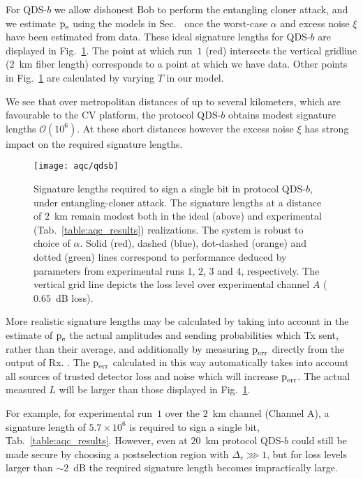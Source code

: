 For QDS-$b$ we allow dishonest Bob to perform the entangling cloner attack, and we estimate $\text{p}_{\text{e}}$ using the models in Sec.~ once the worst-case $\alpha$ and excess noise $\xi$ have been estimated from data. These ideal signature lengths for QDS-$b$ are displayed in Fig.~\ref{fig:aqc_qdsb}. The point at which run~$1$ (red) intersects the vertical gridline ($2$~km fiber length) corresponds to a point at which we have data. Other points in Fig.~\ref{fig:aqc_qdsb} are calculated by varying $T$ in our model.

We see that over metropolitan distances of up to several kilometers, which are favourable to the CV platform, the protocol QDS-$b$ obtains modest signature lengths $\mathcal{O}\left(10^6\right)$. At these short distances however the excess noise $\xi$ has strong impact on the required signature lengths.

\begin{figure}[htp]
\centering
\texttt{[image: aqc/qdsb]}
\caption{\label{fig:aqc_qdsb} Signature lengths required to sign a single bit in protocol QDS-$b$, under entangling-cloner attack. The signature lengths at a distance of $2$~km remain modest both in the ideal (above) and experimental (Tab.~\ref{table:aqc_results}) realizations. The system is robust to choice of $\alpha$. Solid (red), dashed (blue), dot-dashed (orange) and dotted (green) lines correspond to performance deduced by parameters from experimental runs $1$, $2$, $3$ and $4$, respectively. The vertical grid line depicts the loss level over experimental channel $A$ ($0.65$~dB loss).}
\end{figure} %

More realistic signature lengths may be calculated by taking into account in the estimate of $\text{p}_{\text{e}}$ the actual amplitudes and sending probabilities which Tx sent, rather than their average, and additionally by measuring $\text{p}_{\text{err}}$ directly from the output of Rx. . The $\text{p}_{\text{err}}$ calculated in this way automatically takes into account all sources of trusted detector loss and noise which will increase $\text{p}_{\text{err}}$. The actual measured $L$ will be larger than those displayed in Fig.~\ref{fig:aqc_qdsb}. 

For example, for experimental run~$1$ over the $2$~km channel (Channel A), a signature length of $5.7 \times 10^6$ is required to sign a single bit, Tab.~\ref{table:aqc_results}. However, even at $20$~km protocol QDS-$b$ could still be made secure by choosing a postselection region with $\Delta_r \ggg 1$, but for loss levels larger than $\sim 2$~dB the required signature length becomes impractically large.

